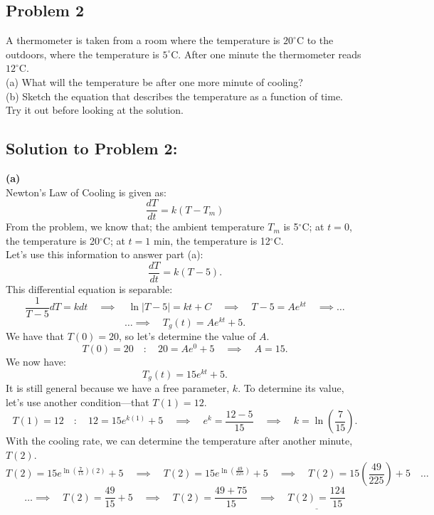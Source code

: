 \documentclass[a4paper,12pt]{article} %
\begin{document}
\subsection*{Problem 2}
A thermometer is taken from a room where the temperature is $20^{\circ}\mathrm{C}$ to the outdoors, where the temperature is $5^{\circ} \mathrm{C}$. After one minute the thermometer reads $12^{\circ} \mathrm{C}$.\\

(a) What will the temperature be after one more minute of cooling?\\
(b) Sketch the equation that describes the temperature as a function of time.\\

Try it out before looking at the solution.

\pagebreak

\subsection*{Solution to Problem 2:}
\textbf{(a)}\\
Newton's Law of Cooling is given as:
$$\frac{d T}{d t}=k\left(T-T_m\right)$$
From the problem, we know that; the ambient temperature $T_m$ is 5$^{\circ}$C; at $t=0$, the temperature is 20$^{\circ}$C; at $t=1$ min, the temperature is 12$^{\circ}$C.\\

Let's use this information to answer part (a):
$$ \frac{dT}{dt} = k(T-5). $$
This differential equation is separable:
$$ \frac{1}{T-5}dT = k dt \quad\implies\quad \ln{|T-5|} = kt + C \quad\implies\quad T-5 = Ae^{kt} \quad\implies\ldots$$
$$ \ldots\implies\quad T_g(t) = Ae^{kt} + 5. $$
We have that $T(0)=20$, so let's determine the value of $A$.
$$ T(0)=20\quad:\quad 20 = Ae^{0}+5 \quad\implies\quad A = 15. $$
We now have:
$$ T_g(t) = 15e^{kt} + 5. $$
It is still general because we have a free parameter, $k$. To determine its value, let's use another condition---that $T(1)=12$.
$$ T(1)=12\quad:\quad 12 = 15e^{k(1)} + 5 \quad\implies\quad e^k=\frac{12-5}{15} \quad\implies\quad k=\ln{\left(\frac{7}{15}\right)}.$$
With the cooling rate, we can determine the temperature after another minute, $T(2)$.
$$ T(2) = 15e^{\ln{\left(\frac{7}{15}\right)}(2)} + 5 \quad\implies\quad T(2) = 15e^{\ln{\left(\frac{49}{225}\right)}} + 5  \quad\implies\quad T(2) = 15\left(\frac{49}{225}\right) + 5 \quad\ldots$$
$$ \ldots\implies\quad T(2) = \frac{49}{15} + 5 \quad\implies\quad T(2) = \frac{49 +75}{15} \quad\implies\quad \underline{\boxed{T(2) = \frac{124}{15}}} $$
\end{document}
